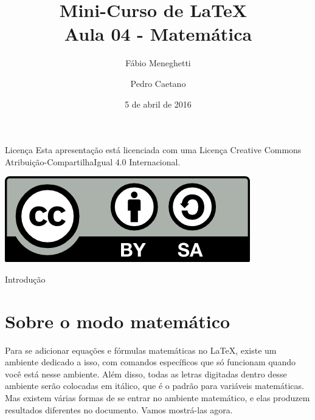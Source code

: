 \documentclass[12pt]{beamer}
\title{Mini-Curso de \LaTeX\ \\ Aula 04 - Matemática}
\author{Fábio Meneghetti \and Pedro Caetano}
\date{5 de abril de 2016}
\begin{document}
\begin{frame}
  \titlepage
\end{frame}

\begin{frame}{Licença}
  Esta apresentação está licenciada com uma Licença Creative Commons Atribuição-CompartilhaIgual 4.0 Internacional.
  \begin{center}
    \includegraphics[scale=0.3]{../license.png}
  \end{center}
\end{frame}

\begin{frame}
  \tableofcontents
\end{frame}

\begin{frame}{Introdução}
  \section{Sobre o modo matemático}
  Para se adicionar equações e fórmulas matemáticas no \LaTeX, existe um ambiente dedicado a isso, com comandos específicos que só funcionam quando você está nesse ambiente. Além disso, todas as letras digitadas dentro desse ambiente serão colocadas em itálico, que é o padrão para variáveis matemáticas.
  \\[1cm]
  Mas existem várias formas de se entrar no ambiente matemático, e elas produzem resultados diferentes no documento. Vamos mostrá-las agora.
\end{frame}
\end{document}
